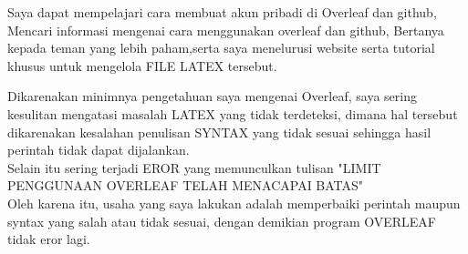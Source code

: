 \documentclass[a4paper,10pt]{article}
\begin{document}
\begin{eulernotebook}
\begin{eulercomment}
\begin{eulercomment}
\begin{eulercomment}
\end{eulercomment}
\begin{eulercomment}
Saya dapat mempelajari cara membuat akun pribadi di Overleaf dan github, Mencari informasi
mengenai cara menggunakan overleaf dan github, Bertanya kepada teman yang lebih paham,serta
saya menelurusi website serta tutorial khusus untuk mengelola FILE LATEX tersebut.


\end{eulercomment}
\begin{eulercomment}
Dikarenakan minimnya pengetahuan saya mengenai Overleaf, saya sering kesulitan mengatasi
masalah LATEX yang tidak terdeteksi, dimana hal tersebut dikarenakan kesalahan penulisan
SYNTAX yang tidak sesuai sehingga hasil perintah tidak dapat dijalankan.\\
Selain itu sering terjadi EROR yang memunculkan tulisan "LIMIT PENGGUNAAN OVERLEAF TELAH
MENACAPAI BATAS"\\
Oleh karena itu, usaha yang saya lakukan adalah memperbaiki perintah maupun syntax yang salah
atau tidak sesuai, dengan demikian program OVERLEAF tidak eror lagi.
\end{eulercomment}
\end{eulernotebook}
\end{document}
